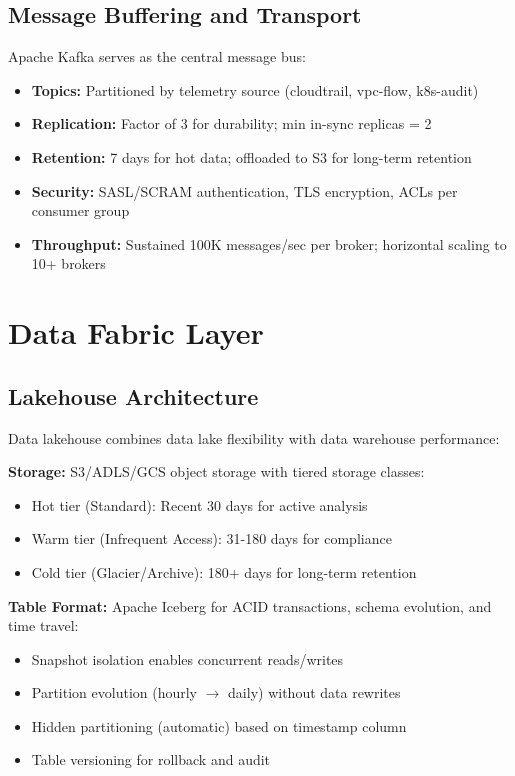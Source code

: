 \subsection{Message Buffering and Transport}
Apache Kafka serves as the central message bus:
\begin{itemize}
    \item \textbf{Topics:} Partitioned by telemetry source (cloudtrail, vpc-flow, k8s-audit)
    \item \textbf{Replication:} Factor of 3 for durability; min in-sync replicas = 2
    \item \textbf{Retention:} 7 days for hot data; offloaded to S3 for long-term retention
    \item \textbf{Security:} SASL/SCRAM authentication, TLS encryption, ACLs per consumer group
    \item \textbf{Throughput:} Sustained 100K messages/sec per broker; horizontal scaling to 10+ brokers
\end{itemize}

\section{Data Fabric Layer}\label{sec:arch-datafabric}
\subsection{Lakehouse Architecture}
Data lakehouse combines data lake flexibility with data warehouse performance:

\textbf{Storage:} S3/ADLS/GCS object storage with tiered storage classes:
\begin{itemize}
    \item Hot tier (Standard): Recent 30 days for active analysis
    \item Warm tier (Infrequent Access): 31-180 days for compliance
    \item Cold tier (Glacier/Archive): 180+ days for long-term retention
\end{itemize}

\textbf{Table Format:} Apache Iceberg for ACID transactions, schema evolution, and time travel:
\begin{itemize}
    \item Snapshot isolation enables concurrent reads/writes
    \item Partition evolution (hourly $\rightarrow$ daily) without data rewrites
    \item Hidden partitioning (automatic) based on timestamp column
    \item Table versioning for rollback and audit
\end{itemize}

